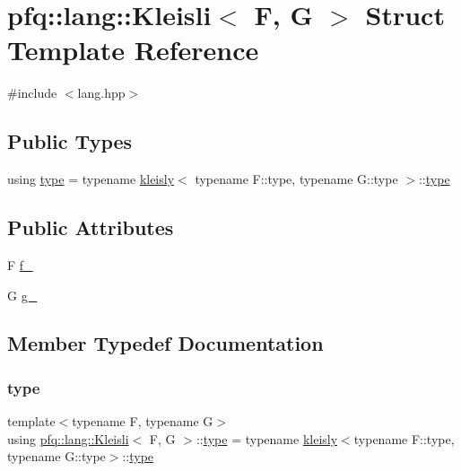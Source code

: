 \hypertarget{structpfq_1_1lang_1_1Kleisli}{}\section{pfq\+:\+:lang\+:\+:Kleisli$<$ F, G $>$ Struct Template Reference}
\label{structpfq_1_1lang_1_1Kleisli}


{\ttfamily \#include $<$lang.\+hpp$>$}

\subsection*{Public Types}
\begin{DoxyCompactItemize}
\item 
using \hyperlink{structpfq_1_1lang_1_1Kleisli_af25d7b2324d773054a01edc8ea5dab85}{type} = typename \hyperlink{structpfq_1_1lang_1_1kleisly}{kleisly}$<$ typename F\+::type, typename G\+::type $>$\+::\hyperlink{structpfq_1_1lang_1_1Kleisli_af25d7b2324d773054a01edc8ea5dab85}{type}
\end{DoxyCompactItemize}
\subsection*{Public Attributes}
\begin{DoxyCompactItemize}
\item 
F \hyperlink{structpfq_1_1lang_1_1Kleisli_a904b72f295e1a832136714faca8a5119}{f\+\_\+}
\item 
G \hyperlink{structpfq_1_1lang_1_1Kleisli_a29fe52c910805bb5d9582e1ee9a8b2ab}{g\+\_\+}
\end{DoxyCompactItemize}


\subsection{Member Typedef Documentation}
\mbox{\label{structpfq_1_1lang_1_1Kleisli_af25d7b2324d773054a01edc8ea5dab85}} 
\subsubsection{\texorpdfstring{type}{type}}
{\footnotesize\ttfamily template$<$typename F, typename G$>$ \\
using \hyperlink{structpfq_1_1lang_1_1Kleisli}{pfq\+::lang\+::\+Kleisli}$<$ F, G $>$\+::\hyperlink{structpfq_1_1lang_1_1Kleisli_af25d7b2324d773054a01edc8ea5dab85}{type} =  typename \hyperlink{structpfq_1_1lang_1_1kleisly}{kleisly}$<$typename F\+::type, typename G\+::type$>$\+::\hyperlink{structpfq_1_1lang_1_1Kleisli_af25d7b2324d773054a01edc8ea5dab85}{type}}



